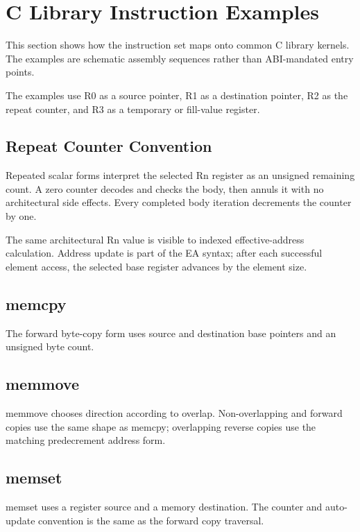 \clearpage
\section{C Library Instruction Examples}

This section shows how the instruction set maps onto common C library kernels. The examples are schematic assembly
sequences rather than ABI-mandated entry points.

The examples use R0 as a source pointer, R1 as a destination pointer, R2 as the repeat counter, and R3 as a
temporary or fill-value register.

\subsection{Repeat Counter Convention}
Repeated scalar forms interpret the selected Rn register as an unsigned remaining count. A zero counter decodes
and checks the body, then annuls it with no architectural side effects. Every completed body iteration decrements
the counter by one.

The same architectural Rn value is visible to indexed effective-address calculation. Address update is part of the
EA syntax; after each successful element access, the selected base register advances by the element size.

\subsection{memcpy}
The forward byte-copy form uses source and destination base pointers and an unsigned byte count.



\subsection{memmove}
memmove chooses direction according to overlap. Non-overlapping and forward copies use the same shape as memcpy;
overlapping reverse copies use the matching predecrement address form.



\subsection{memset}
memset uses a register source and a memory destination. The counter and auto-update convention is the same as the
forward copy traversal.

